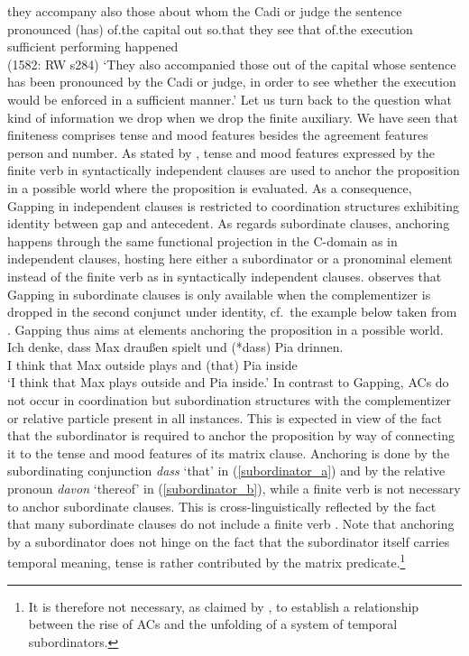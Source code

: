 \documentclass[output=paper,colorlinks,citecolor=brown]{langscibook}
\begin{document}
they accompany also those about whom the Cadi or judge the sentence pronounced (has) of.the capital out so.that they see that of.the execution sufficient performing happened    \\ \hfill (1582: RW s284)
\glt `They also accompanied those out of the capital whose sentence has been pronounced by the Cadi or judge, in order to see whether the execution would be enforced in a sufficient manner.'
\z
Let us turn back to the question what kind of information we drop when we drop the finite auxiliary. We have seen that finiteness comprises tense and mood features besides the agreement features person and number. As stated by \citet{repp2009}, tense and mood features expressed by the finite verb in syntactically independent clauses are used to anchor the proposition in a possible world where the proposition is evaluated. As a consequence, Gapping in independent clauses is restricted to coordination structures exhibiting identity between gap and antecedent. As regards subordinate clauses, anchoring happens through the same functional projection in the C-domain as in independent clauses, hosting here either a subordinator or a pronominal element instead of the finite verb as in syntactically independent clauses. \citet{repp2009} observes that Gapping in subordinate clauses is only available when the complementizer is dropped in the second conjunct under identity, cf.\ the example below taken from \citet{repp2009}. Gapping thus aims at elements anchoring the proposition in a possible world. 
\ea \label{gapping_d}
\gll Ich denke, dass Max draußen spielt und (*dass) Pia drinnen. \\ I think that Max outside plays and (that) Pia inside \\
\glt `I think that Max plays outside and Pia inside.'
\z
In contrast to Gapping, ACs do not occur in coordination but subordination structures with the complementizer or relative particle present in all instances. This is expected in view of the fact that the subordinator is required to anchor the proposition by way of connecting it to the tense and mood features of its matrix clause. Anchoring is done by the subordinating conjunction \textit{dass} `that' in (\ref{subordinator_a}) and by the relative pronoun \textit{davon} `thereof' in (\ref{subordinator_b}), while a finite verb is not necessary to anchor subordinate clauses. This is cross-linguistically reflected by the fact that many subordinate clauses do not include a finite verb \citep{repp2009}. Note that anchoring by a subordinator does not hinge on the fact that the subordinator itself carries temporal meaning, tense is rather contributed by the matrix predicate.\footnote{It is therefore not necessary, as claimed by \citet[105]{breitbarth2005}, to establish a relationship between the rise of ACs and the unfolding of a system of temporal subordinators.}
\end{document}
